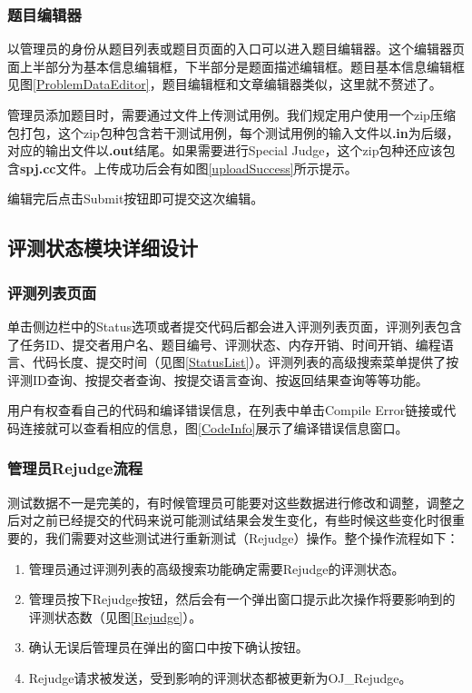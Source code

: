 
\subsubsection{题目编辑器}
以管理员的身份从题目列表或题目页面的入口可以进入题目编辑器。这个编辑器页面上半部分为基本信息编辑框，下半部分是题面描述编辑框。题目基本信息编辑框见图\ref{ProblemDataEditor}，题目编辑框和文章编辑器类似，这里就不赘述了。


管理员添加题目时，需要通过文件上传测试用例。我们规定用户使用一个zip压缩包打包，这个zip包种包含若干测试用例，每个测试用例的输入文件以\textbf{.in}为后缀，对应的输出文件以\textbf{.out}结尾。如果需要进行Special Judge，这个zip包种还应该包含\textbf{spj.cc}文件。上传成功后会有如图\ref{uploadSuccess}所示提示。


编辑完后点击Submit按钮即可提交这次编辑。

\subsection{评测状态模块详细设计}
\subsubsection{评测列表页面}
单击侧边栏中的Status选项或者提交代码后都会进入评测列表页面，评测列表包含了任务ID、提交者用户名、题目编号、评测状态、内存开销、时间开销、编程语言、代码长度、提交时间（见图\ref{StatusList}）。评测列表的高级搜索菜单提供了按评测ID查询、按提交者查询、按提交语言查询、按返回结果查询等等功能。

用户有权查看自己的代码和编译错误信息，在列表中单击Compile Error链接或代码连接就可以查看相应的信息，图\ref{CodeInfo}展示了编译错误信息窗口。


\subsubsection{管理员Rejudge流程}
测试数据不一是完美的，有时候管理员可能要对这些数据进行修改和调整，调整之后对之前已经提交的代码来说可能测试结果会发生变化，有些时候这些变化时很重要的，我们需要对这些测试进行重新测试（Rejudge）操作。整个操作流程如下：
\begin{enumerate}
	\item 管理员通过评测列表的高级搜索功能确定需要Rejudge的评测状态。
	\item 管理员按下Rejudge按钮，然后会有一个弹出窗口提示此次操作将要影响到的评测状态数（见图\ref{Rejudge}）。
	\item 确认无误后管理员在弹出的窗口中按下确认按钮。
	\item Rejudge请求被发送，受到影响的评测状态都被更新为OJ\_Rejudge。
\end{enumerate}

